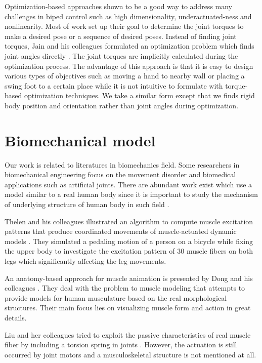 \documentclass[master,english,final]{kaist-ucs}
\begin{document}
Optimization-based approaches shown to be a good way to address many challenges
in biped control such as high dimensionality, underactuated-ness and
nonlinearity. Most of work set up their goal to determine the joint
torques to make a desired pose or a sequence of desired poses.
Instead of finding joint torques, Jain and his colleagues formulated
an optimization problem which finds joint angles directly \cite{Jain:09:OIM}. The joint torques
are implicitly calculated during the optimization process. The advantage of
this approach is that it is easy to design various types of objectives such as
moving a hand to nearby wall or placing a swing foot to a certain place while it
is not intuitive to formulate with torque-based optimization techniques.
We take a similar form except that we finds rigid body position
and orientation rather than joint angles during optimization.

\section{Biomechanical model}

Our work is related to literatures in biomechanics field.
Some researchers in biomechanical engineering focus on the movement
disorder and biomedical applications such as artificial joints.
There are abundant work exist which use a model similar to
a real human body since it is important to study the mechanism of underlying
structure of human body in such field \cite{vr-305}.

Thelen and his colleagues illustrated
an algorithm to compute muscle excitation patterns that produce
coordinated movements of muscle-actuated dynamic models \cite{Thelen2003321}.
They simulated
a pedaling motion of a person on a bicycle while fixing the upper body to investigate the excitation
pattern of 30 muscle fibers on both legs which significantly affecting the leg movements.

An anatomy-based approach for muscle animation is presented by Dong and his colleagues \cite{10.1109/2945.998668}.
They deal with the problem to muscle modeling that attempts to provide models for human musculature based
on the real morphological structures. Their main focus lies on visualizing muscle form and action in
great details.

Liu and her colleagues tried to exploit the passive characteristics of
real muscle fiber by including a torsion spring in joints \cite{Liu:2005:LPB}.
However, the actuation
is still occurred by joint motors and a musculoskeletal structure is not mentioned at all.
\end{document}

